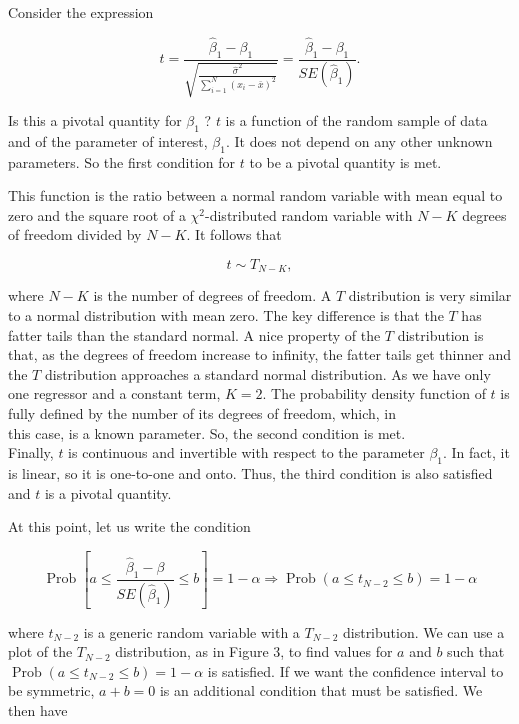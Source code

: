 Consider the expression

$$
t=\frac{\widehat{\beta}_{1}-\beta_{1}}{\sqrt{\frac{\widehat{\sigma}^{2}}{\sum_{i=1}^{N}\left(x_{i}-\bar{x}\right)^{2}}}}=\frac{\widehat{\beta}_{1}-\beta_{1}}{S E\left(\widehat{\beta}_{1}\right)} .
$$

Is this a pivotal quantity for $\beta_{1}$ ? $t$ is a function of the random sample of data and of the parameter of interest, $\beta_{1}$. It does not depend on any other unknown parameters. So the first condition for $t$ to be a pivotal quantity is met.

This function is the ratio between a normal random variable with mean equal to zero and the square root of a $\chi^{2}$-distributed random variable with $N-K$ degrees of freedom divided by $N-K$. It follows that

$$
t \sim T_{N-K},
$$

where $N-K$ is the number of degrees of freedom. A $T$ distribution is very similar to a normal distribution with mean zero. The key difference is that the $T$ has fatter tails than the standard normal. A nice property of the $T$ distribution is that, as the degrees of freedom increase to infinity, the fatter tails get thinner and the $T$ distribution approaches a standard normal distribution. As we have only one regressor and a constant term, $K=2$. The probability density function of $t$ is fully defined by the number of its degrees of freedom, which, in\\
this case, is a known parameter. So, the second condition is met.\\
Finally, $t$ is continuous and invertible with respect to the parameter $\beta_{1}$. In fact, it is linear, so it is one-to-one and onto. Thus, the third condition is also satisfied and $t$ is a pivotal quantity.

At this point, let us write the condition

$$
\operatorname{Prob}\left[a \leq \frac{\widehat{\beta}_{1}-\beta}{S E\left(\widehat{\beta}_{1}\right)} \leq b\right]=1-\alpha \Longrightarrow \operatorname{Prob}\left(a \leq t_{N-2} \leq b\right)=1-\alpha
$$

where $t_{N-2}$ is a generic random variable with a $T_{N-2}$ distribution. We can use a plot of the $T_{N-2}$ distribution, as in Figure 3, to find values for $a$ and $b$ such that $\operatorname{Prob}\left(a \leq t_{N-2} \leq b\right)=1-\alpha$ is satisfied. If we want the confidence interval to be symmetric, $a+b=0$ is an additional condition that must be satisfied. We then have

